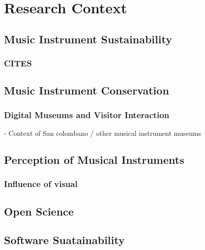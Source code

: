 \chapter{Research Context}


\section{Music Instrument Sustainability}
\subsection{CITES}
\section{Music Instrument Conservation}
\subsection{Digital Museums and Visitor Interaction}
- Context of San colombano / other musical instrument museums
\section{Perception of Musical Instruments}
\subsection{Influence of visual}

\section{Open Science}
\section{Software Suatainability}

